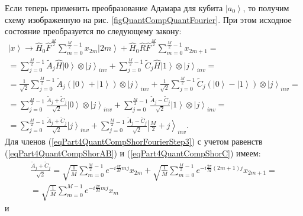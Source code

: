 

Если теперь применить преобразование Адамара для кубита
$\left|a_0\right>$, то получим схему изображенную на
рис. \ref{figQuantCompQuantFourier}. При этом исходное состояние
преобразуется по следующему закону:
\begin{eqnarray}
\left|x\right> \rightarrow
\hat{H}_0\hat{F}^{\frac{M}{2}} \sum_{m = 0}^{\frac{M}{2} - 1}x_{2m} \left|2m\right> +
\hat{H}_0\hat{R}\hat{F}^{\frac{M}{2}}\sum_{m = 0}^{\frac{M}{2} - 1} x_{2m + 1} =
\nonumber \\
=
\sum_{j = 0}^{\frac{M}{2} - 1}
\tilde{A}_{j}
\hat{H}\left|0\right> \otimes \left|j\right>_{inv}
+
\sum_{j = 0}^{\frac{M}{2} - 1} 
\tilde{C}_{j}
\hat{H}\left|1\right> \otimes \left|j\right>_{inv} 
=
\nonumber \\
= 
\frac{1}{\sqrt{2}}\sum_{j = 0}^{\frac{M}{2} - 1}
\tilde{A}_{j} 
\left(\left|0\right> + \left|1\right> \right) \otimes  
\left|j\right>_{inv}
+
\frac{1}{\sqrt{2}}\sum_{j = 0}^{\frac{M}{2} - 1}
\tilde{C}_{j} 
\left(\left|0\right> - \left|1\right> \right) \otimes  
\left|j\right>_{inv}
=
\nonumber \\
=
\sum_{j = 0}^{\frac{M}{2} - 1}
\frac{\tilde{A}_{j} + \tilde{C}_{j} }{\sqrt{2}} 
\left|0\right> \otimes \left|j\right>_{inv} +
\sum_{j = 0}^{\frac{M}{2} - 1}
\frac{ \tilde{A}_{j} - \tilde{C}_{j}}{\sqrt{2}} 
\left|1\right> \otimes \left|j\right>_{inv}
=
\nonumber \\
=
\sum_{j = 0}^{\frac{M}{2} - 1}
\frac{\tilde{A}_{j} + \tilde{C}_{j} }{\sqrt{2}} \left|j\right>_{inv} +
\sum_{j = 0}^{\frac{M}{2} - 1}
\frac{ \tilde{A}_{j} - \tilde{C}_{j}}{\sqrt{2}} 
\left|\frac{M}{2} + j \right>_{inv}.
\label{eqPart4QuantCompShorFourierStep3}
\end{eqnarray}
Для членов (\ref{eqPart4QuantCompShorFourierStep3}) с учетом равенств
(\ref{eqPart4QuantCompShorAB}) и (\ref{eqPart4QuantCompShorC}) имеем:
\begin{eqnarray}
\frac{\tilde{A}_{j} + \tilde{C}_{j} }{\sqrt{2}} = 
\sqrt{\frac{1}{M}} 
\sum_{m = 0}^{\frac{M}{2} - 1} e^{-i \frac{4 \pi}{M} m j} x_{2m}  +
\sqrt{\frac{1}{M}} 
\sum_{m = 0}^{\frac{M}{2} - 1} 
e^{-i \frac{2 \pi}{M} \left(2m+1\right) j} x_{2m+1} = 
\nonumber \\
=
\sqrt{\frac{1}{M}} \sum_{m = 0}^{M - 1}
e^{-i \frac{2 \pi}{M} m j} x_{m}
\label{eqPart4QuantCompShorFourierStep3_1}
\end{eqnarray}
и
